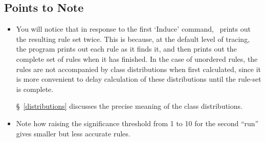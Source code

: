 \subsection*{Points to Note}
\begin{itemize}
 \item You will notice that in response to the first `Induce' command, 
\CN\ prints out the resulting rule set twice.  This is because,
at the default level of tracing, the program prints out each
rule as it finds it, and then prints out the complete set
of rules when it has finished.   In the case of unordered rules,
the rules are not accompanied by class distributions when
first calculated, since it is more convenient to delay calculation
of these distributions until the rule-set is complete.

\S~\ref{distributions} discusses the precise meaning of the class
distributions.

 \item Note how raising the significance threshold from 1 to 10
       for the second ``run''
       gives smaller but less accurate  rules.
\end{itemize}


